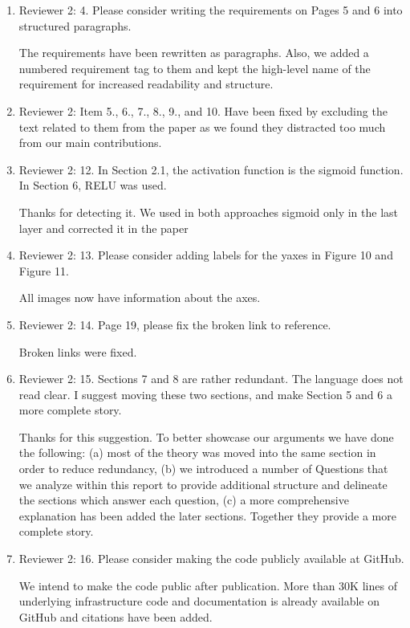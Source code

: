\documentclass{article}
\begin{document}
\begin{enumerate}
\item Reviewer 2: 4.  Please consider writing the requirements on Pages 5 and 6 into structured paragraphs.

    The requirements have been rewritten as paragraphs. Also, we added a numbered requirement tag to them and kept the high-level name of the requirement for increased readability and structure.

\item Reviewer 2: Item 5., 6., 7., 8., 9., and 10. Have been fixed by excluding the text related to them from the paper as we found they distracted too much from our main contributions.

\item Reviewer 2: 12.  In Section 2.1,  the activation function is the sigmoid function.  In Section 6, RELU was used.

    Thanks for detecting it. We used in both approaches sigmoid only in the last layer and corrected it in the paper

\item Reviewer 2: 13.  Please consider adding labels for the yaxes in Figure 10 and Figure 11.

    All images now have information about the axes.

\item Reviewer 2: 14.  Page 19, please fix the broken link to reference.

    Broken links were fixed.

\item Reviewer 2: 15.  Sections 7 and 8 are rather redundant.  The language does not read clear.  I suggest moving these two sections, and make Section 5 and 6 a more complete story.

    Thanks for this suggestion. To better showcase our arguments we have done the following: (a) most of the theory was moved into the same section in order to reduce redundancy, (b) we introduced a number of Questions that we analyze within this report to provide additional structure and delineate the sections which answer each question, (c) a more comprehensive explanation has been added the later sections. Together they provide a more complete story.

\item Reviewer 2: 16.  Please consider making the code publicly available at GitHub. 

    We intend to make the code public after publication. More than 30K lines of underlying infrastructure code and documentation is already available on GitHub and citations have been added.

\end{enumerate}
\end{document}
